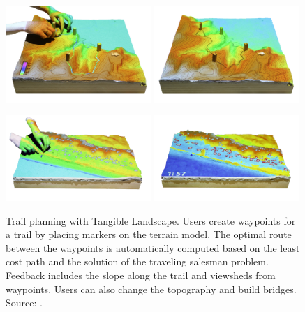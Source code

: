 \documentclass[prodmode,acmtochi]{acmsmall} %
\begin{document}
\begin{figure}
%
\begin{center}
		\includegraphics[width=0.49\textwidth]{images/applications/trail_2.jpg}
		\includegraphics[width=0.49\textwidth]{images/applications/trail_4.jpg}
	\caption{Trail planning with Tangible Landscape. Users create waypoints for a trail by placing markers on the terrain model. The optimal route between the waypoints is automatically computed based on the least cost path and the solution of the traveling salesman problem. Feedback includes the slope along the trail and viewsheds from waypoints. Users can also change the topography and build bridges. Source: \cite{Petrasova2015}.}
	\label{fig:trails}
\end{center}
%
\begin{center}
		\includegraphics[width=0.49\textwidth]{images/applications/tl_coastal_3s.png}
		\includegraphics[width=0.49\textwidth]{images/applications/tl_coastal_4s.png}

\end{center}
\end{figure}
\end{document}
